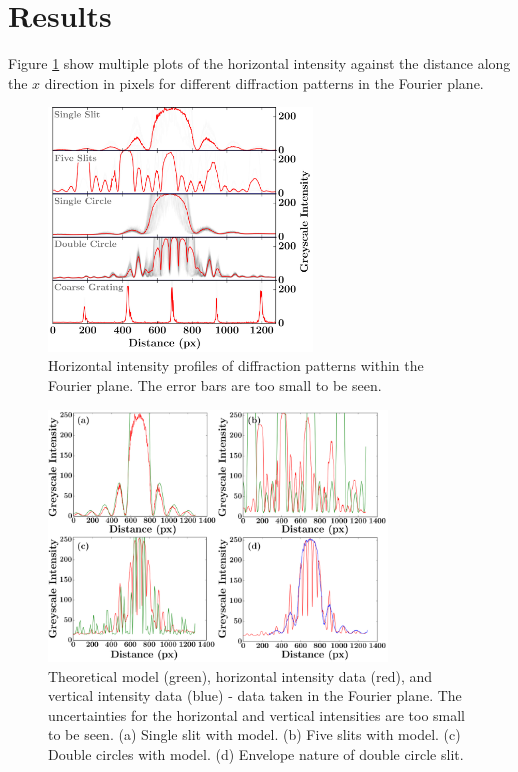 \documentclass[twocolumn]{revtex4}
\begin{document}
\section{Results}
\vspace{-2ex}
Figure \ref{horizontal_profiles} show multiple plots of the horizontal intensity against the distance along the $x$ direction in pixels for different diffraction patterns in the Fourier plane. 
\begin{figure}[!h]
\begin{center}
\includegraphics[width=7cm]{results/horizontal_intensity_profiles3}
\caption[]{Horizontal intensity profiles of diffraction patterns within the Fourier plane. The error bars are too small to be seen.}
\label{horizontal_profiles}
\end{center}
\end{figure}
\begin{figure}[!h]
\begin{center}
\includegraphics[width=9cm]{results/data_and_models2}
\caption[]{Theoretical model (green), horizontal intensity data (red), and vertical intensity data (blue) - data taken in the Fourier plane. The uncertainties for the horizontal and vertical intensities are too small to be seen. (a) Single slit with model. (b) Five slits with model. (c) Double circles with model. (d) Envelope nature of double circle slit.}
\label{datamodels}
\end{center}
\end{figure}
\end{document}
